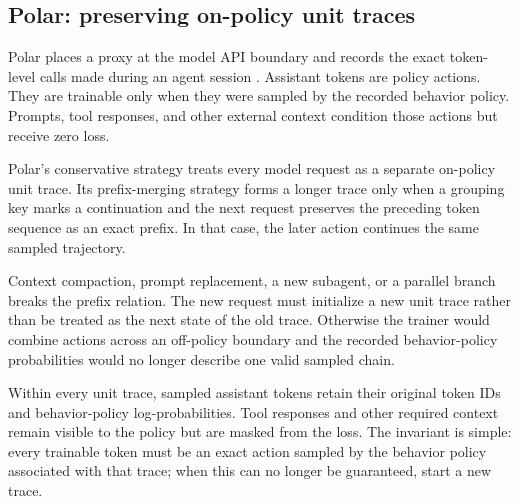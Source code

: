 \subsection{Polar: preserving on-policy unit traces}

Polar places a proxy at the model API boundary and records the exact token-level calls made
during an agent session \citep{xu2026polar}. Assistant tokens are policy actions. They are
trainable only when they were sampled by the recorded behavior policy. Prompts, tool
responses, and other external context condition those actions but receive zero loss.

Polar's conservative strategy treats every model request as a separate on-policy unit
trace. Its prefix-merging strategy forms a longer trace only when a grouping key marks a
continuation and the next request preserves the preceding token sequence as an exact
prefix. In that case, the later action continues the same sampled trajectory.

Context compaction, prompt replacement, a new subagent, or a parallel branch breaks the
prefix relation. The new request must initialize a new unit trace rather than be treated as
the next state of the old trace. Otherwise the trainer would combine actions across an
off-policy boundary and the recorded behavior-policy probabilities would no longer
describe one valid sampled chain.

Within every unit trace, sampled assistant tokens retain their original token IDs and
behavior-policy log-probabilities. Tool responses and other required context remain visible
to the policy but are masked from the loss. The invariant is simple: every trainable token
must be an exact action sampled by the behavior policy associated with that trace; when
this can no longer be guaranteed, start a new trace.
